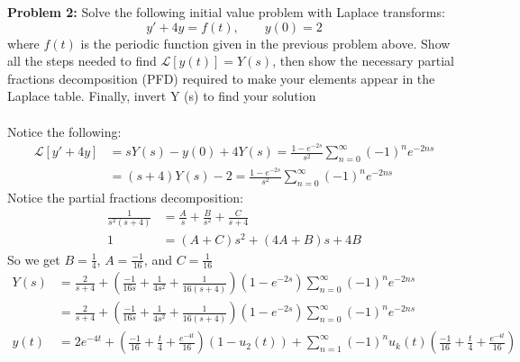 \documentclass[12pt]{article}
\begin{document}
\newpage 

\noindent \textbf{Problem 2: }Solve the following initial value problem with Laplace transforms:
	$$
	y' + 4y = f(t), \qquad y(0) = 2
	$$
where $f(t)$ is the periodic function given in the previous problem above. Show all the steps needed
to find $\mathcal{L}[y(t)] = Y(s)$, then show the necessary partial fractions decomposition (PFD) required to
make your elements appear in the Laplace table. Finally, invert Y (s) to find your solution
\\ \\
Notice the following:
	\begin{align*}
		\mathcal{L}[y' + 4y] &= sY(s) - y(0) + 4Y(s) = \frac{1 - e^{-2s}}{s^2}\sum_{n = 0}^{\infty} (-1)^ne^{-2ns} \\
		&= (s+4)Y(s) - 2 = \frac{1 - e^{-2s}}{s^2}\sum_{n = 0}^{\infty} (-1)^ne^{-2ns}
	\end{align*}
Notice the partial fractions decomposition:
	\begin{align*}
		\frac{1}{s^2(s+4)} &= \frac{A}{s} + \frac{B}{s^2} + \frac{C}{s+4} \\
		1 &= (A+C)s^2 + (4A+B)s + 4B
	\end{align*}
So we get $B = \frac{1}{4}$, $A = \frac{-1}{16}$, and $C = \frac{1}{16}$
	\begin{align*}
		Y(s) &= \frac{2}{s+4} + \left(\frac{-1}{16s} + \frac{1}{4s^2} + \frac{1}{16(s+4)}\right)\left(1 - e^{-2s}\right)\sum_{n = 0}^{\infty} (-1)^ne^{-2ns} \\
		&= \frac{2}{s+4} + \left(\frac{-1}{16s} + \frac{1}{4s^2} + \frac{1}{16(s+4)}\right)\left(1 - e^{-2s}\right)\sum_{n = 0}^{\infty} (-1)^ne^{-2ns} \\
		y(t) &= 2e^{-4t} + \left(\frac{-1}{16} + \frac{t}{4} + \frac{e^{-4t}}{16}\right)(1 - u_2(t)) + \sum_{n = 1}^{\infty} (-1)^nu_k(t)\left(\frac{-1}{16} + \frac{t}{4} + \frac{e^{-4t}}{16}\right)
	\end{align*}

\newpage 
\end{document}
